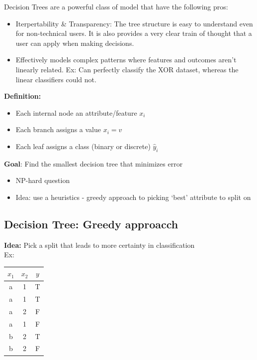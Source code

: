 \documentclass[12pt]{article}
\begin{document}
Decision Trees are a powerful class of model that have the following pros:

\begin{itemize}
	\item Iterpertability \& Transparency: The tree structure is easy to understand even for non-technical users. It is also provides a very clear train of thought that a user can apply when making decisions. 
	\item Effectively models complex patterns where features and outcomes aren't linearly related. Ex: Can perfectly classify the XOR dataset, whereas the linear classifiers could not.
\end{itemize}

\textbf{Definition:} 

\begin{itemize}
	\item Each internal node an attribute/feature $x_i$
	\item Each branch assigns a value $x_i = v$
	\item Each leaf assigns a class (binary or discrete) $\hat{y}_i$
\end{itemize}

\textbf{Goal}: Find the smallest decision tree that minimizes error

\begin{itemize}
	\item NP-hard question
	\item Idea: use a heuristics - greedy approach to picking ‘best’ attribute to split on
\end{itemize}

\subsection{Decision Tree: Greedy approacch} \label{sub:14.1}

\textbf{Idea:} Pick a split that leads to more certainty in classification\\

Ex: \begin{tabular}{|c|c|c|}
	\hline
	$x_1$ & $x_2$ & $y$\\
	\hline
	a & 1 & T\\
	\hline
	a & 1 & T\\
	\hline
	a & 2 & F\\
	\hline
	a & 1 & F\\
	\hline
	b & 2 & T\\
	\hline
	b & 2 & F\\
	\hline
\end{tabular}\\
\end{document}
